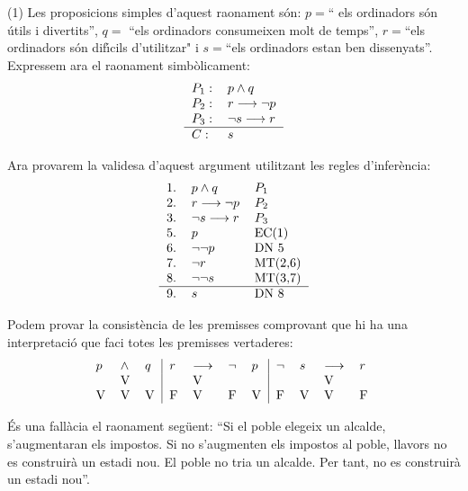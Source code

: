 \begin{solucio}
(1) Les proposicions simples d'aquest raonament s\'{o}n: $p=$\textquotedblleft
els ordinadors s\'{o}n \'{u}tils i divertits\textquotedblright, $q=$%
\textquotedblleft els ordinadors consumeixen molt de temps\textquotedblright,
$r=$\textquotedblleft els ordinadors s\'{o}n dif\'{\i}cils d'utilitzar" i
$s=$\textquotedblleft els ordinadors estan ben dissenyats\textquotedblright.
Expressem ara el raonament simb\`{o}licament:%
\[%
\begin{tabular}
[c]{ll}%
$P_{1}:$ & $p\wedge q$\\
$P_{2}:$ & $r\longrightarrow\lnot p$\\
$P_{3}:$ & $\lnot s\longrightarrow r$\\\hline
$C:$ & $s$%
\end{tabular}
\]


Ara provarem la validesa d'aquest argument utilitzant les regles
d'infer\`{e}ncia:%
\[%
\begin{tabular}
[c]{lll}%
1. & $p\wedge q$ & $P_{1}$\\
2. & $r\longrightarrow\lnot p$ & $P_{2}$\\
3. & $\lnot s\longrightarrow r$ & $P_{3}$\\
5. & $p$ & EC(1)\\
6. & $\lnot\lnot p$ & DN 5\\
7. & $\lnot r$ & MT(2,6)\\
8. & $\lnot\lnot s$ & MT(3,7)\\\hline
9. & $s$ & DN 8
\end{tabular}
\]


Podem provar la consist\`{e}ncia de les premisses comprovant que hi ha una
interpretaci\'{o} que faci totes les premisses vertaderes:%
\[%
\begin{tabular}
[c]{lll|llll|llll}%
$p$ & $\wedge$ & $q$ & $r$ & $\longrightarrow$ & $\lnot$ & $p$ & $\lnot$ & $s$
& $\longrightarrow$ & $r$\\
& V &  &  & V &  &  &  &  & V & \\
V & V & V & F & V & F & V & F & V & V & F
\end{tabular}
\
\]

\end{solucio}

\begin{exer}
\'{E}s una fal\textperiodcentered l\`{a}cia el raonament seg\"{u}ent:
\textquotedblleft Si el poble elegeix un alcalde, s'augmentaran els impostos.
Si no s'augmenten els impostos al poble, llavors no es construir\`{a} un
estadi nou. El poble no tria un alcalde. Per tant, no es construir\`{a} un
estadi nou\textquotedblright.
\end{exer}

